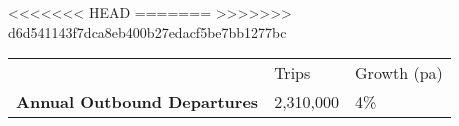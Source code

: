 <<<<<<< HEAD
=======
>>>>>>> d6d541143f7dca8eb400b27edacf5be7bb1277bc
\begin{tabular}[t]{p{4.7cm}>{\hfill}p{1.1cm}>{\hfill}p{1.7cm}}
   & Trips & Growth (pa) \\ 
 \textbf{Annual Outbound Departures} & 2,310,000 & 4\% \\ 
  \end{tabular}
